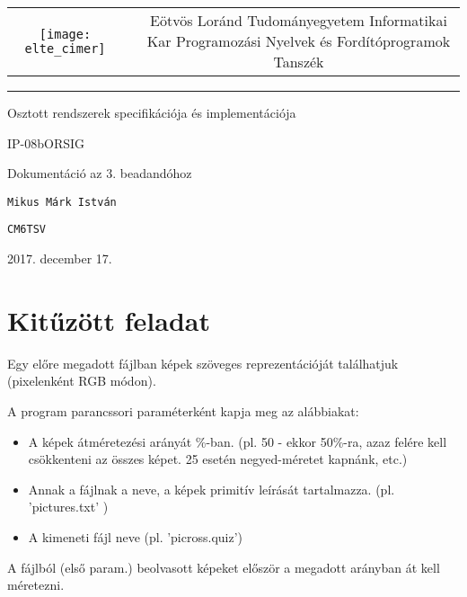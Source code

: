\documentclass[12pt]{article}
\begin{document}
	
\begin{titlepage}
	\vspace*{0cm}
	\centering
	\begin{tabular}{cp{1cm}c}
		\begin{minipage}{4cm}
			\vspace{0pt}
			\texttt{[image: elte\_cimer]}
		\end{minipage} & &
		\begin{minipage}{7cm}
			\vspace{0pt}Eötvös Loránd Tudományegyetem \vspace{10pt} \newline
			Informatikai Kar \vspace{10pt} \newline
			Programozási Nyelvek és Fordítóprogramok Tanszék
		\end{minipage}
	\end{tabular}
	
	\vspace*{0.2cm}
	\rule{\textwidth}{1pt}
	
	\vspace*{3cm}
	{\Huge Osztott rendszerek specifikációja és implementációja }
	
	\vspace*{0.5cm}
	{\normalsize IP-08bORSIG}
	
	\vspace{2cm}
	{\huge Dokumentáció az 3. beadandóhoz}
	
	\vspace*{5cm}
	
	{\large \verb|Mikus Márk István| } %
	
	{\large \verb|CM6TSV| }  %
		
	
	\vfill
	
	\vspace*{1cm}
	2017. december 17. %
\end{titlepage}

\section{Kitűzött feladat}
Egy előre megadott fájlban képek szöveges reprezentációját találhatjuk (pixelenként RGB módon).

A program parancssori paraméterként kapja meg az alábbiakat:
\begin{itemize}
  \item A képek átméretezési arányát \%-ban. (pl. 50 - ekkor 50\%-ra, azaz felére kell csökkenteni az összes képet. 25 esetén negyed-méretet kapnánk, etc.)
  \item Annak a fájlnak a neve, a képek primitív leírását tartalmazza. (pl. 'pictures.txt' )
  \item A kimeneti fájl neve (pl. 'picross.quiz')
\end{itemize}
A fájlból (első param.) beolvasott képeket először a megadott arányban át kell méretezni.
\end{document}
